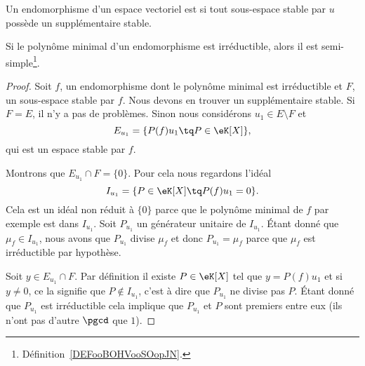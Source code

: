 \begin{definition}  \label{DEFooBOHVooSOopJN}
    Un endomorphisme d'un espace vectoriel est  si tout sous-espace stable par \( u\) possède un supplémentaire stable.
\end{definition}

\begin{lemma}   \label{LemrFINYT}
    Si le polynôme minimal d'un endomorphisme est irréductible, alors il est semi-simple\footnote{Définition~\ref{DEFooBOHVooSOopJN}.}.
\end{lemma}

\begin{proof}
    Soit \( f\), un endomorphisme dont le polynôme minimal est irréductible et \( F\), un sous-espace stable par \( f\). Nous devons en trouver un supplémentaire stable. Si \( F=E\), il n'y a pas de problèmes. Sinon nous considérons \( u_1\in E\setminus F\) et
    \begin{equation}
        E_{u_1}=\{ P(f)u_1\tq P\in \eK[X] \},
    \end{equation}
    qui est un espace stable par \( f\).

    Montrons que \( E_{u_1}\cap F=\{ 0 \}\). Pour cela nous regardons l'idéal
    \begin{equation}
        I_{u_1}=\{ P\in \eK[X]\tq P(f)u_1=0 \}.
    \end{equation}
    Cela est un idéal non réduit à \( \{ 0 \}\) parce que le polynôme minimal de \( f\) par exemple est dans \( I_{u_1}\). Soit \( P_{u_1}\) un générateur unitaire de \( I_{u_1}\). Étant donné que \( \mu_f\in I_{u_1}\), nous avons que \( P_{u_1}\) divise \( \mu_f\) et donc \( P_{u_1}=\mu_f\) parce que \( \mu_f\) est irréductible par hypothèse.

    Soit \( y\in E_{u_1}\cap F\). Par définition il existe \( P\in\eK[X]\) tel que \( y=P(f)u_1\) et si \( y\neq 0\), ce la signifie que \( P\notin I_{u_1}\), c'est à dire que \( P_{u_1} \) ne divise pas \( P\). Étant donné que \( P_{u_1}\) est irréductible cela implique que \( P_{u_1}\) et \( P\) sont premiers entre eux (ils n'ont pas d'autre \( \pgcd\) que \( 1\)).


\end{proof}
